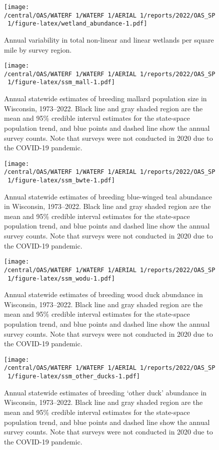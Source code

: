 \documentclass[
  12pt,
]{article}
\begin{document}
\newpage

\begin{figure}
\centering
\texttt{[image: /central/OAS/WATERF~1/WATERF~1/AERIAL~1/reports/2022/OAS\_SP~1/figure-latex/wetland\_abundance-1.pdf]}
\caption{\label{fig:wetland_abundance}Annual variability in total
non-linear and linear wetlands per square mile by survey region.}
\end{figure}

\newpage

\begin{figure}
\centering
\texttt{[image: /central/OAS/WATERF~1/WATERF~1/AERIAL~1/reports/2022/OAS\_SP~1/figure-latex/ssm\_mall-1.pdf]}
\caption{\label{fig:ssm_mall}Annual statewide estimates of breeding
mallard population size in Wisconsin, 1973--2022. Black line and gray
shaded region are the mean and 95\% credible interval estimates for the
state-space population trend, and blue points and dashed line show the
annual survey counts. Note that surveys were not conducted in 2020 due
to the COVID-19 pandemic.}
\end{figure}

\newpage

\begin{figure}
\centering
\texttt{[image: /central/OAS/WATERF~1/WATERF~1/AERIAL~1/reports/2022/OAS\_SP~1/figure-latex/ssm\_bwte-1.pdf]}
\caption{\label{fig:ssm_bwte}Annual statewide estimates of breeding
blue-winged teal abundance in Wisconsin, 1973--2022. Black line and gray
shaded region are the mean and 95\% credible interval estimates for the
state-space population trend, and blue points and dashed line show the
annual survey counts. Note that surveys were not conducted in 2020 due
to the COVID-19 pandemic.}
\end{figure}

\newpage

\begin{figure}
\centering
\texttt{[image: /central/OAS/WATERF~1/WATERF~1/AERIAL~1/reports/2022/OAS\_SP~1/figure-latex/ssm\_wodu-1.pdf]}
\caption{\label{fig:ssm_wodu}Annual statewide estimates of breeding wood
duck abundance in Wisconsin, 1973--2022. Black line and gray shaded
region are the mean and 95\% credible interval estimates for the
state-space population trend, and blue points and dashed line show the
annual survey counts. Note that surveys were not conducted in 2020 due
to the COVID-19 pandemic.}
\end{figure}

\newpage

\begin{figure}
\centering
\texttt{[image: /central/OAS/WATERF~1/WATERF~1/AERIAL~1/reports/2022/OAS\_SP~1/figure-latex/ssm\_other\_ducks-1.pdf]}
\caption{\label{fig:ssm_other_ducks}Annual statewide estimates of
breeding `other duck' abundance in Wisconsin, 1973--2022. Black line and
gray shaded region are the mean and 95\% credible interval estimates for
the state-space population trend, and blue points and dashed line show
the annual survey counts. Note that surveys were not conducted in 2020
due to the COVID-19 pandemic.}
\end{figure}
\end{document}
